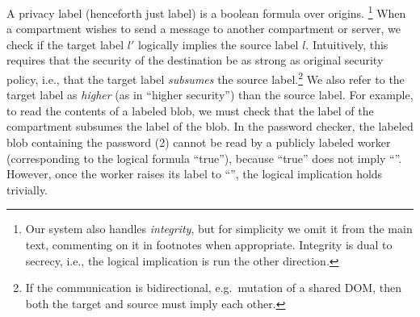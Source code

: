 A privacy label (henceforth just label) is a boolean formula over
origins.%
%
\footnote{
  Our system also handles \emph{integrity}, but for simplicity we
  omit it from the main text, commenting on it in footnotes when
  appropriate.  Integrity is dual to secrecy, i.e., the logical
  implication is run the other direction.
}
%
When a compartment wishes to send a message to another compartment or
server, we check if the target label $l'$ logically implies the source
label $l$.
%
Intuitively, this requires that the security of the destination be as strong as original security policy, i.e., that the target label \emph{subsumes} the source label.\footnote{If the communication is bidirectional, e.g.\ mutation of a shared DOM, then both the target and source must imply each other.}
%
We also refer to the target label as \emph{higher} (as in ``higher security'') than the source label.
%
For example, to read the contents of a labeled blob, we must check that
the label of the compartment subsumes the label of the blob.
%
In the password checker, the labeled blob containing the password (2)
cannot be read by a publicly labeled worker (corresponding to the
logical formula ``true''), because ``true'' does not imply
``''.
%
However, once the worker raises its label to ``'', the
logical implication holds trivially.

%

